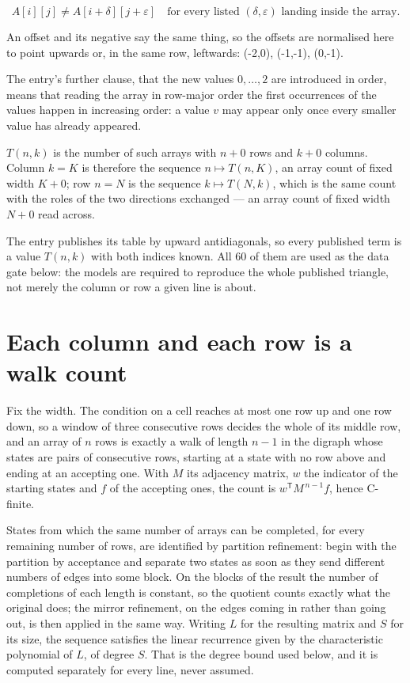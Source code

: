 \documentclass[11pt]{article}
\theoremstyle{definition}
\begin{document}
\[A[i][j] \ne A[i{+}\delta][j{+}\varepsilon]\quad\text{for every listed }(\delta,\varepsilon)\text{ landing inside the array.}\]

An offset and its negative say the same thing, so the offsets are normalised here to point upwards or, in the same row, leftwards: (-2,0), (-1,-1), (0,-1).

The entry's further clause, that the new values $0,\dots,2$ are introduced in order, means that reading the array in row-major order the first occurrences of the values happen in increasing order: a value $v$ may appear only once every smaller value has already appeared.

$T(n,k)$ is the number of such arrays with $n + 0$ rows and $k + 0$ columns. Column $k = K$ is therefore the sequence $n \mapsto T(n,K)$, an array count of fixed width $K + 0$; row $n = N$ is the sequence $k \mapsto T(N,k)$, which is the same count with the roles of the two directions exchanged --- an array count of fixed width $N + 0$ read across.

The entry publishes its table by upward antidiagonals, so every published term is a value $T(n,k)$ with both indices known. All 60 of them are used as the data gate below: the models are required to reproduce the whole published triangle, not merely the column or row a given line is about.

\section{Each column and each row is a walk count}

Fix the width. The condition on a cell reaches at most one row up and one row down, so a window of three consecutive rows decides the whole of its middle row, and an array of $n$ rows is exactly a walk of length $n-1$ in the digraph whose states are pairs of consecutive rows, starting at a state with no row above and ending at an accepting one. With $M$ its adjacency matrix, $w$ the indicator of the starting states and $f$ of the accepting ones, the count is $w^{\mathsf T}M^{\,n-1}f$, hence C-finite.

States from which the same number of arrays can be completed, for every remaining number of rows, are identified by partition refinement: begin with the partition by acceptance and separate two states as soon as they send different numbers of edges into some block. On the blocks of the result the number of completions of each length is constant, so the quotient counts exactly what the original does; the mirror refinement, on the edges coming in rather than going out, is then applied in the same way. Writing $L$ for the resulting matrix and $S$ for its size, the sequence satisfies the linear recurrence given by the characteristic polynomial of $L$, of degree $S$. That is the degree bound used below, and it is computed separately for every line, never assumed.
\end{document}
